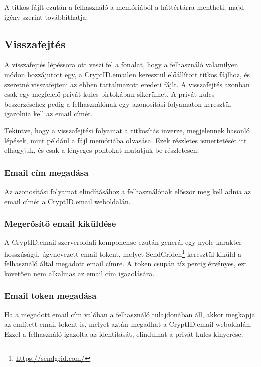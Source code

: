 A titkos fájlt ezután a felhasználó a memóriából a háttértárra mentheti, majd igény szerint továbbíthatja.

\subsection{Visszafejtés}

A visszafejtés lépéssora ott veszi fel a fonalat, hogy a felhasználó valamilyen módon hozzájutott egy, a CryptID.emailen keresztül előállított titkos fájlhoz, és szeretné visszafejteni az ebben tartalmazott eredeti fájlt. A visszafejtés azonban csak egy megfelelő privát kulcs birtokában sikerülhet. A privát kulcs beszerzésehez pedig a felhasználónak egy azonosítási folyamaton keresztül igazolnia kell az email címét.

Tekintve, hogy a visszafejtési folyamat a titkosítás inverze, megjelennek hasonló lépések, mint például a fájl memóriába olvasása. Ezek részletes ismertetését itt elhagyjuk, és csak a lényeges pontokat mutatjuk be részletesen.

\subsubsection{Email cím megadása}

Az azonosítási folyamat elindításához a felhasználónak először meg kell adnia az email címét a CryptID.email weboldalán.

\subsubsection{Megerősítő email kiküldése}

A CryptID.email szerveroldali komponense ezután generál egy nyolc karakter hosszúságú, úgynevezett email tokent, melyet SendGriden\footnote{\url{https://sendgrid.com/}} keresztül kiküld a felhasználó által megadott email címre. A token csupán tíz percig érvényes, ezt követően nem alkalmas az email cím igazolására.

\subsubsection{Email token megadása}

Ha a megadott email cím valóban a felhasználó tulajdonában áll, akkor megkapja az említett email tokent is, melyet aztán megadhat a CryptID.email weboldalán. Ezzel a felhasználó igazolta az identitását, elindulhat a privát kulcs kinyerése.


